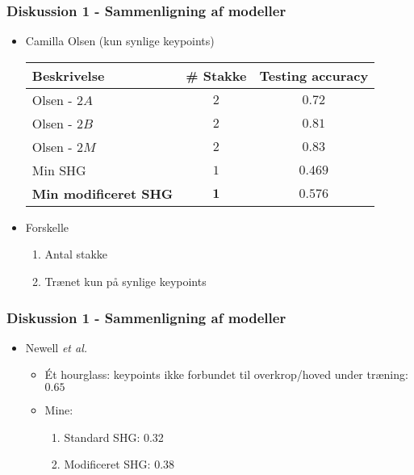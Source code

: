 \documentclass{beamer}
\begin{document}
\begin{frame}
    \frametitle{Diskussion 1 - Sammenligning af modeller}
    \begin{itemize}
        \item<1-2> Camilla Olsen (kun synlige keypoints)
        \begin{tabular}{l|c|c}
            Beskrivelse & \# Stakke & Testing accuracy \\
            \hline
            Olsen - $2A$ & $2$ & $0.72$ \\
            \hline
            Olsen - $2B$ & $2$ & $0.81$ \\
            \hline
            Olsen - $2M$ & $2$ & $0.83$ \\
            \hline
            \hline
            Min SHG & $1$ & $0.469$ \\
            \hline
            \textbf{Min modificeret SHG} & $\bm{1}$ & $\bm{0.576}$ \\
            \hline
        \end{tabular}
        \item<2> Forskelle
        \begin{enumerate}
            \item Antal stakke
            \item Trænet kun på synlige keypoints
        \end{enumerate}
    \end{itemize}
\end{frame}

\begin{frame}
    \frametitle{Diskussion 1 - Sammenligning af modeller}
    \begin{itemize}
        \item<1-> Newell \textit{et al.}
        \begin{itemize}
            \item<1-> Ét hourglass: keypoints ikke forbundet til overkrop/hoved under træning: $0.65$
            \item<1-> Mine:
            \begin{enumerate}
                \item Standard SHG: 0.32
                \item Modificeret SHG: 0.38
            \end{enumerate}
        \end{itemize}
    \end{itemize}
\end{frame}
\end{document}
